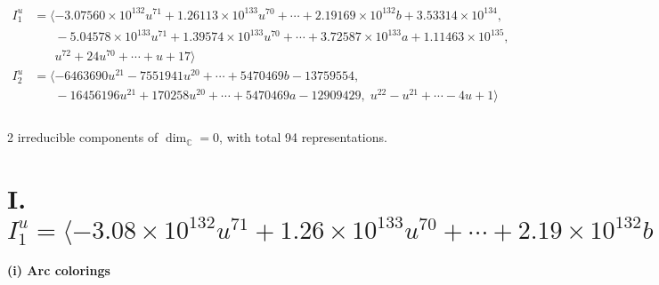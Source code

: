 \documentclass[1p]{elsarticle_modified}
\theoremstyle{definition}
\begin{document}
\begin{align*}
I^u_{1}&=\langle 
-3.07560\times10^{132} u^{71}+1.26113\times10^{133} u^{70}+\cdots+2.19169\times10^{132} b+3.53314\times10^{134},\\
\phantom{I^u_{1}}&\phantom{= \langle  }-5.04578\times10^{133} u^{71}+1.39574\times10^{133} u^{70}+\cdots+3.72587\times10^{133} a+1.11463\times10^{135},\\
\phantom{I^u_{1}}&\phantom{= \langle  }u^{72}+24 u^{70}+\cdots+u+17\rangle \\
I^u_{2}&=\langle 
-6463690 u^{21}-7551941 u^{20}+\cdots+5470469 b-13759554,\\
\phantom{I^u_{2}}&\phantom{= \langle  }-16456196 u^{21}+170258 u^{20}+\cdots+5470469 a-12909429,\;u^{22}- u^{21}+\cdots-4 u+1\rangle \\
\\
\end{align*}
\raggedright * 2 irreducible components of $\dim_{\mathbb{C}}=0$, with total 94 representations.\\
\newpage
\renewcommand{\arraystretch}{1}
\centering \section*{I. $I^u_{1}= \langle -3.08\times10^{132} u^{71}+1.26\times10^{133} u^{70}+\cdots+2.19\times10^{132} b+3.53\times10^{134},\;-5.05\times10^{133} u^{71}+1.40\times10^{133} u^{70}+\cdots+3.73\times10^{133} a+1.11\times10^{135},\;u^{72}+24 u^{70}+\cdots+u+17 \rangle$}
\flushleft \textbf{(i) Arc colorings}\\
\end{document}
